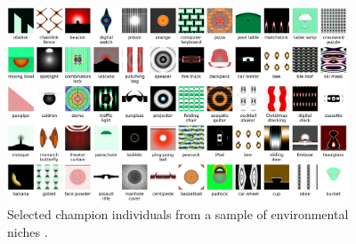 \begin{figure}
    \centering
    \includegraphics[width=0.9\textwidth]{img/ie_greatest_hits}
 	\captionsetup{singlelinecheck=off,justification=raggedright}
  	\caption{Selected champion individuals from a sample of environmental niches \cite[Figure 7]{Nguyen2015InnovationLearning}.}
    \label{fig:ie_results}
\end{figure}